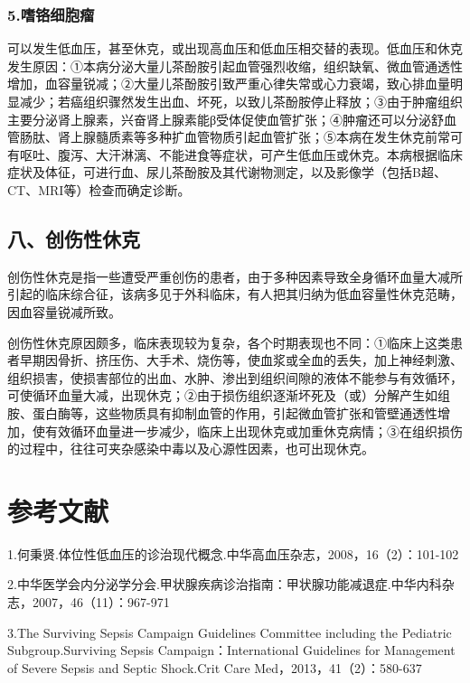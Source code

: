 \subsubsection{5.嗜铬细胞瘤}

可以发生低血压，甚至休克，或出现高血压和低血压相交替的表现。低血压和休克发生原因：①本病分泌大量儿茶酚胺引起血管强烈收缩，组织缺氧、微血管通透性增加，血容量锐减；②大量儿茶酚胺引致严重心律失常或心力衰竭，致心排血量明显减少；若癌组织骤然发生出血、坏死，以致儿茶酚胺停止释放；③由于肿瘤组织主要分泌肾上腺素，兴奋肾上腺素能β受体促使血管扩张；④肿瘤还可以分泌舒血管肠肽、肾上腺髓质素等多种扩血管物质引起血管扩张；⑤本病在发生休克前常可有呕吐、腹泻、大汗淋漓、不能进食等症状，可产生低血压或休克。本病根据临床症状及体征，可进行血、尿儿茶酚胺及其代谢物测定，以及影像学（包括B超、CT、MRI等）检查而确定诊断。

\subsection{八、创伤性休克}

创伤性休克是指一些遭受严重创伤的患者，由于多种因素导致全身循环血量大减所引起的临床综合征，该病多见于外科临床，有人把其归纳为低血容量性休克范畴，因血容量锐减所致。

创伤性休克原因颇多，临床表现较为复杂，各个时期表现也不同：①临床上这类患者早期因骨折、挤压伤、大手术、烧伤等，使血浆或全血的丢失，加上神经刺激、组织损害，使损害部位的出血、水肿、渗出到组织间隙的液体不能参与有效循环，可使循环血量大减，出现休克；②由于损伤组织逐渐坏死及（或）分解产生如组胺、蛋白酶等，这些物质具有抑制血管的作用，引起微血管扩张和管壁通透性增加，使有效循环血量进一步减少，临床上出现休克或加重休克病情；③在组织损伤的过程中，往往可夹杂感染中毒以及心源性因素，也可出现休克。

\protect\hypertarget{text00117.html}{}{}

\section{参考文献}

1.何秉贤.体位性低血压的诊治现代概念.中华高血压杂志，2008，16（2）：101-102

2.中华医学会内分泌学分会.甲状腺疾病诊治指南：甲状腺功能减退症.中华内科杂志，2007，46（11）：967-971

3.The Surviving Sepsis Campaign Guidelines Committee including the
Pediatric Subgroup.Surviving Sepsis Campaign：International Guidelines
for Management of Severe Sepsis and Septic Shock.Crit Care
Med，2013，41（2）：580-637

